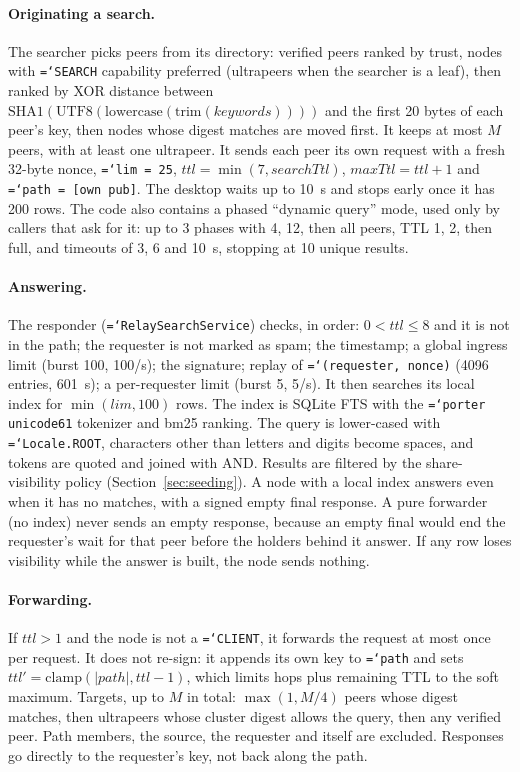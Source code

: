 \documentclass[11pt,a4paper]{article}
\newcommand{\code}[1]{\texttt{\hyphenchar\font=`\-\relax #1}}
\DeclareRobustCommand{\_}{\origunderscore\allowbreak}
\begin{document}
\paragraph{Originating a search.} The searcher picks peers from its directory: verified
peers ranked by trust, nodes with \code{SEARCH} capability preferred (ultrapeers when the
searcher is a leaf), then ranked by XOR distance between
$\mathrm{SHA1}(\mathrm{UTF8}(\mathrm{lowercase}(\mathrm{trim}(\mathit{keywords}))))$ and the first
20 bytes of each peer's key, then nodes whose digest matches are moved first. It keeps at
most $M$ peers, with at least one ultrapeer. It sends each peer its own request with a fresh
32-byte nonce, \code{lim = 25}, $\mathit{ttl} = \min(7, \mathit{searchTtl})$,
$\mathit{maxTtl} = \mathit{ttl}+1$ and \code{path = [own pub]}. The desktop waits up to 10~s
and stops early once it has 200 rows. The code also contains a phased ``dynamic query''
mode, used only by callers that ask for it: up to 3 phases with 4, 12, then all peers, TTL 1,
2, then full, and timeouts of 3, 6 and 10~s, stopping at 10 unique results.

\paragraph{Answering.} The responder (\code{RelaySearchService}) checks, in order: $0 < \mathit{ttl} \le 8$
and it is not in the path; the requester is not marked as spam; the timestamp; a global
ingress limit (burst 100, 100/s); the signature; replay of \code{(requester, nonce)} (4096
entries, 601~s); a per-requester limit (burst 5, 5/s). It then searches its local index for
$\min(\mathit{lim}, 100)$ rows. The index is SQLite FTS with the \code{porter unicode61}
tokenizer and bm25 ranking. The query is lower-cased with \code{Locale.ROOT}, characters
other than letters and digits become spaces, and tokens are quoted and joined with AND.
Results are filtered by the share-visibility policy (Section~\ref{sec:seeding}). A node
with a local index answers even when it has no matches, with a signed empty final response.
A pure forwarder (no index) never sends an empty response, because an empty final would end
the requester's wait for that peer before the holders behind it answer. If any row loses
visibility while the answer is built, the node sends nothing.

\paragraph{Forwarding.} If $\mathit{ttl} > 1$ and the node is not a \code{CLIENT}, it
forwards the request at most once per request. It does not re-sign: it appends its own key
to \code{path} and sets $\mathit{ttl'} = \mathrm{clamp}(|\mathit{path}|, \mathit{ttl}-1)$,
which limits hops plus remaining TTL to the soft maximum. Targets, up to $M$ in total:
$\max(1, M/4)$ peers whose digest matches, then ultrapeers whose cluster digest allows the
query, then any verified peer. Path members, the source, the requester and itself are
excluded. Responses go directly to the requester's key, not back along the path.
\end{document}
